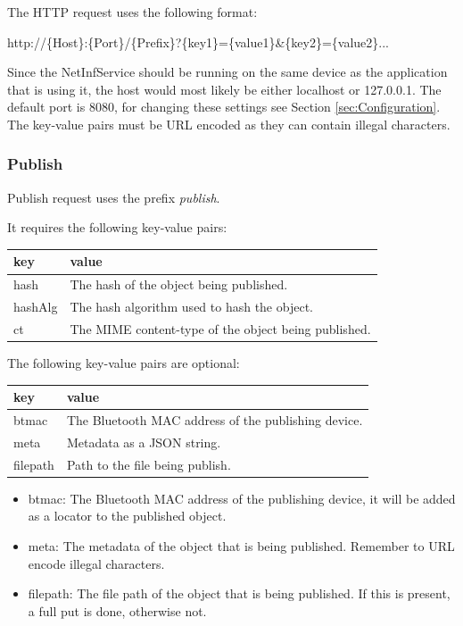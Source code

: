 The HTTP request uses the following format:

\begin{center}
http://\{Host\}:\{Port\}/\{Prefix\}?\{key1\}=\{value1\}\&\{key2\}=\{value2\}...
\end{center}

Since the NetInfService should be running on the same device as the application that is using it, the host would most likely be either localhost or 127.0.0.1. The default port is 8080, for changing these settings see Section \ref{sec:Configuration}. The key-value pairs must be URL encoded as they can contain illegal characters.

\subsubsection{Publish}

Publish request uses the prefix \emph{publish}.

It requires the following key-value pairs:

\begin{tabular}{ | l | l | }
	\hline
	key & value  \\ \hline \hline
	hash & The hash of the object being published.  \\ \hline
	hashAlg & The hash algorithm used to hash the object. \\ \hline
	ct & The MIME content-type of the object being published. \\ \hline
\end{tabular}

The following key-value pairs are optional:

\begin{tabular}{ | l | l | }
	\hline
	key & value  \\ \hline \hline
	btmac & The Bluetooth MAC address of the publishing device. \\ \hline
	meta & Metadata as a JSON string. \\ \hline
	filepath & Path to the file being publish. \\ \hline
\end{tabular}

\begin{itemize}
	\item btmac: The Bluetooth MAC address of the publishing device, it will be added as a locator to the published object.
	\item meta: The metadata \cite{netinfproto} of the object that is being published. Remember to URL encode illegal characters.
	\item filepath: The file path of the object that is being published. If this is present, a full put is done, otherwise not.
 \end{itemize}

